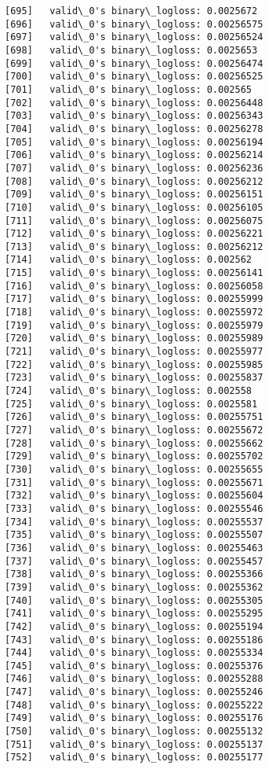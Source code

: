 \documentclass[11pt]{article}
\begin{document}
\begin{Verbatim}[commandchars=\\\{\}]
[695]	valid\_0's binary\_logloss: 0.0025672
[696]	valid\_0's binary\_logloss: 0.00256575
[697]	valid\_0's binary\_logloss: 0.00256524
[698]	valid\_0's binary\_logloss: 0.0025653
[699]	valid\_0's binary\_logloss: 0.00256474
[700]	valid\_0's binary\_logloss: 0.00256525
[701]	valid\_0's binary\_logloss: 0.002565
[702]	valid\_0's binary\_logloss: 0.00256448
[703]	valid\_0's binary\_logloss: 0.00256343
[704]	valid\_0's binary\_logloss: 0.00256278
[705]	valid\_0's binary\_logloss: 0.00256194
[706]	valid\_0's binary\_logloss: 0.00256214
[707]	valid\_0's binary\_logloss: 0.00256236
[708]	valid\_0's binary\_logloss: 0.00256212
[709]	valid\_0's binary\_logloss: 0.00256151
[710]	valid\_0's binary\_logloss: 0.00256105
[711]	valid\_0's binary\_logloss: 0.00256075
[712]	valid\_0's binary\_logloss: 0.00256221
[713]	valid\_0's binary\_logloss: 0.00256212
[714]	valid\_0's binary\_logloss: 0.002562
[715]	valid\_0's binary\_logloss: 0.00256141
[716]	valid\_0's binary\_logloss: 0.00256058
[717]	valid\_0's binary\_logloss: 0.00255999
[718]	valid\_0's binary\_logloss: 0.00255972
[719]	valid\_0's binary\_logloss: 0.00255979
[720]	valid\_0's binary\_logloss: 0.00255989
[721]	valid\_0's binary\_logloss: 0.00255977
[722]	valid\_0's binary\_logloss: 0.00255985
[723]	valid\_0's binary\_logloss: 0.00255837
[724]	valid\_0's binary\_logloss: 0.002558
[725]	valid\_0's binary\_logloss: 0.0025581
[726]	valid\_0's binary\_logloss: 0.00255751
[727]	valid\_0's binary\_logloss: 0.00255672
[728]	valid\_0's binary\_logloss: 0.00255662
[729]	valid\_0's binary\_logloss: 0.00255702
[730]	valid\_0's binary\_logloss: 0.00255655
[731]	valid\_0's binary\_logloss: 0.00255671
[732]	valid\_0's binary\_logloss: 0.00255604
[733]	valid\_0's binary\_logloss: 0.00255546
[734]	valid\_0's binary\_logloss: 0.00255537
[735]	valid\_0's binary\_logloss: 0.00255507
[736]	valid\_0's binary\_logloss: 0.00255463
[737]	valid\_0's binary\_logloss: 0.00255457
[738]	valid\_0's binary\_logloss: 0.00255366
[739]	valid\_0's binary\_logloss: 0.00255362
[740]	valid\_0's binary\_logloss: 0.00255305
[741]	valid\_0's binary\_logloss: 0.00255295
[742]	valid\_0's binary\_logloss: 0.00255194
[743]	valid\_0's binary\_logloss: 0.00255186
[744]	valid\_0's binary\_logloss: 0.00255334
[745]	valid\_0's binary\_logloss: 0.00255376
[746]	valid\_0's binary\_logloss: 0.00255288
[747]	valid\_0's binary\_logloss: 0.00255246
[748]	valid\_0's binary\_logloss: 0.00255222
[749]	valid\_0's binary\_logloss: 0.00255176
[750]	valid\_0's binary\_logloss: 0.00255132
[751]	valid\_0's binary\_logloss: 0.00255137
[752]	valid\_0's binary\_logloss: 0.00255177

\end{Verbatim}
\end{document}
